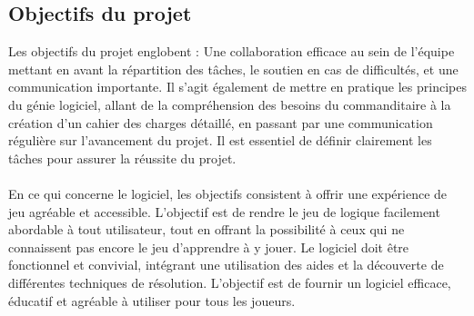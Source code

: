 \subsection{Objectifs du projet}
Les objectifs du projet englobent : Une collaboration efficace au sein de l'équipe mettant en avant la répartition des tâches, le soutien en cas de difficultés, et une communication importante. Il s'agit également de mettre en pratique les principes du génie logiciel, allant de la compréhension des besoins du commanditaire à la création d'un cahier des charges détaillé, en passant par une communication régulière sur l'avancement du projet. Il est essentiel de définir clairement les tâches pour assurer la réussite du projet.
\\\\
En ce qui concerne le logiciel, les objectifs consistent à offrir une expérience de jeu agréable et accessible. L'objectif est de rendre le jeu de logique facilement abordable à tout utilisateur, tout en offrant la possibilité à ceux qui ne connaissent pas encore le jeu d'apprendre à y jouer. Le logiciel doit être fonctionnel et convivial, intégrant une utilisation des aides et la découverte de différentes techniques de résolution. L'objectif est de fournir un logiciel efficace, éducatif et agréable à utiliser pour tous les joueurs.